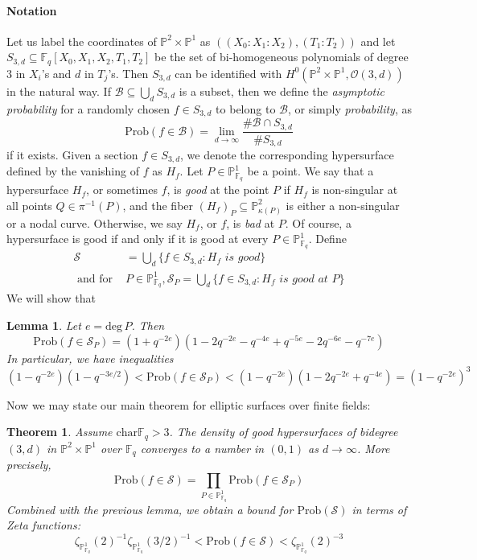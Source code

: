 \documentclass[12pt]{article}
\theoremstyle{plain}
\newtheorem{theorem}[equation]{Theorem}
\newtheorem{lemma}[equation]{Lemma}
\theoremstyle{definition}
\newcommand{\IF}{\mathbb{F}}
\newcommand{\IP}{\mathbb{P}}
\newcommand{\sB}{\mathcal{B}}
\newcommand{\sO}{\mathcal{O}}
\newcommand{\sS}{\mathcal{S}}
\renewcommand{\deg}{\mathrm{deg}\,}
\newcommand\union{\bigcup}
\newcommand{\<}{\langle}
\renewcommand{\>}{\rangle}
\newcommand{\Prob}{\mathrm{Prob}}
\begin{document}
\paragraph{Notation} Let us label the coordinates of $\IP^2 \times \IP^1$ as $((X_0 : X_1 : X_2), (T_1 : T_2))$ and let $S_{3,d} \subseteq \IF_q[X_0, X_1, X_2, T_1, T_2]$ be the set of bi-homogeneous polynomials of degree $3$ in $X_i$'s and $d$ in $T_j$'s. Then $S_{3, d}$ can be identified with $H^0(\IP^2 \times \IP^1, \sO(3, d))$ in the natural way. If $\sB \subseteq \union_d S_{3, d}$ is a subset, then we define the \textit{asymptotic probability} for a randomly chosen $f \in S_{3, d}$ to belong to $\sB$, or simply \textit{probability}, as 
$$ \Prob(f \in \sB) = \lim_{d \to \infty} \frac{\# \sB \cap S_{3, d}}{\# S_{3, d}} $$
if it exists. Given a section $f \in S_{3, d}$, we denote the corresponding hypersurface defined by the vanishing of $f$ as $H_f$. Let $P \in \IP^1_{\IF_q}$ be a point. We say that a hypersurface $H_f$, or sometimes $f$, is \textit{good} at the point $P$ if $H_f$ is non-singular at all points $Q \in \pi^{-1}(P)$, and the fiber $(H_f)_P \subseteq \IP^2_{\kappa(P)}$ is either a non-singular or a nodal curve. Otherwise, we say $H_f$, or $f$, is \textit{bad} at $P$. Of course, a hypersurface is good if and only if it is good at every $P \in \IP^1_{\IF_q}$. 
Define 
\begin{align*} 
\sS &= \union_{d} \{ f \in S_{3, d} : H_f \textit{ is good} \} \\
\text{ and for }&P \in \IP^1_{\IF_q}, \sS_P = \union_{d} \{ f \in S_{3, d} : H_f \textit{ is good at }P \} 
\end{align*}
We will show that 
\begin{lemma}
\label{pcount}
Let $e = \deg P$. Then 
$$\Prob(f \in \sS_{P}) = (1 + q^{-2e})(1 - 2q^{-2e} - q^{-4e} + q^{-5e} - 2q^{-6e} -q^{-7e})$$
In particular, we have inequalities $$(1 - q^{-2e})(1 - q^{-3e/2}) < \Prob(f \in \sS_{P}) < (1 - q^{-2e})(1 - 2 q^{-2e} + q^{-4e}) = (1 - q^{-2e})^3$$
\end{lemma}
Now we may state our main theorem for elliptic surfaces over finite fields:
\begin{theorem} Assume $\mathrm{char} \IF_q > 3$. The density of good hypersurfaces of bidegree $(3, d)$ in $\IP^2 \times \IP^1$ over $\IF_q$ converges to a number in $(0, 1)$ as $d \to \infty$. More precisely,  
$$ \Prob(f \in \sS) = \prod_{P \in \IP^1_{\IF_q}} \Prob( f \in \sS_{P}) $$
Combined with the previous lemma, we obtain a bound for $\Prob(\sS)$ in terms of Zeta functions:
$$ \zeta_{\IP^1_{\IF_q}}(2)^{-1} \zeta_{\IP^1_{\IF_q}}(3/2)^{-1} < \Prob(f \in \sS) < \zeta_{\IP^1_{\IF_q}}(2)^{-3}$$
\end{theorem}
\end{document}
